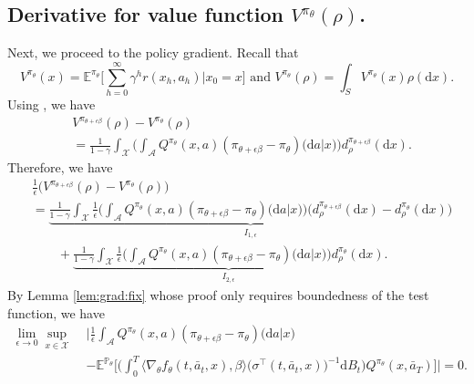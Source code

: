 \documentclass{article}
\newcommand{\1}{\mathbbm{1}}
\numberwithin{equation}{section}
\def\to{\rightarrow}
\def\cA{\mathcal{A}}
\def\cX{\mathcal{X}}
\def\d{{\mathrm{d}}}
\def\sE{{\mathbb{E}}}
\def\sP{\mathbb{P}}
\begin{document}
\subsection{Derivative for value function $V^{\pi_\theta}(\rho)$.}
Next, we proceed to the policy gradient. Recall that
$$
V^{\pi_\theta}(x)=\sE^{\pi_\theta}\bigg[\sum_{h=0}^\infty \gamma^h r(x_h,a_h)\Big|x_0=x\bigg]\text{ and }V^{\pi_\theta}(\rho) = \int_SV^{\pi_\theta}(x)\rho (\d x).
$$
Using \cite[Lemma 2.3]{kerimkulov2025fisher} , we have 
\begin{align*}
  &V^{\pi_{\theta+\epsilon\beta}}(\rho)
  -V^{\pi_{\theta}}(\rho)
  \\
  &=\frac{1}{1-\gamma}\int_\cX\bigg(\int_\cA Q^{\pi_{\theta}} (x,a) (\pi_{\theta+\epsilon \beta}-\pi_{\theta})\big(\d a\big|x\big)
 \bigg)d_\rho^{\pi_{\theta+\epsilon\beta}} (\d x).
\end{align*}
Therefore, we have 
\begin{align*}
  &\frac{1}\epsilon \Big(V^{\pi_{\theta+\epsilon\beta}}(\rho)
  -V^{\pi_{\theta}}(\rho)\Big)
  \\
  &=\underbrace{\frac{1}{1-\gamma}\int_\cX\frac1\epsilon\bigg(\int_\cA Q^{\pi_{\theta}} (x,a) (\pi_{\theta+\epsilon \beta}-\pi_{\theta})\big(\d a\big|x\big)
 \bigg)\Big(d_\rho^{\pi_{\theta+\epsilon\beta}} (\d x)-d_\rho^{\pi_{\theta}} (\d x)\Big)}_{I_{1,\epsilon}}
 \\
 &\qquad+\underbrace{\frac{1}{1-\gamma}\int_\cX\frac1\epsilon\bigg(\int_\cA Q^{\pi_{\theta}} (x,a) (\pi_{\theta+\epsilon \beta}-\pi_{\theta})\big(\d a\big|x\big)
 \bigg)d_\rho^{\pi_{\theta}} (\d x)}_{I_{2,\epsilon}}.
\end{align*}
By Lemma \ref{lem:grad:fix} whose proof only requires boundedness of the test function, we have
\begin{align*}
    \lim_{\epsilon\to 0}\sup_{x\in\mathcal{X}}\;&\Bigg|\frac1{\epsilon}\int_\cA Q^{\pi_{\theta}} (x,a)
  (\pi_{\theta+\epsilon \beta}-\pi_{\theta})\big(\d a\big|x\big)
  \\
  &-\sE^{\sP_\theta}\bigg[\bigg(\int_0^T{\langle\nabla_\theta f_\theta(t,\bar a_t,x),\beta\rangle}\big(\sigma^\top(t,\bar a_t,x)\big)^{-1}\d B_t\bigg)Q^{\pi_{\theta}} (x,\bar a_T)\bigg]\Bigg|=0.
\end{align*}
\end{document}
